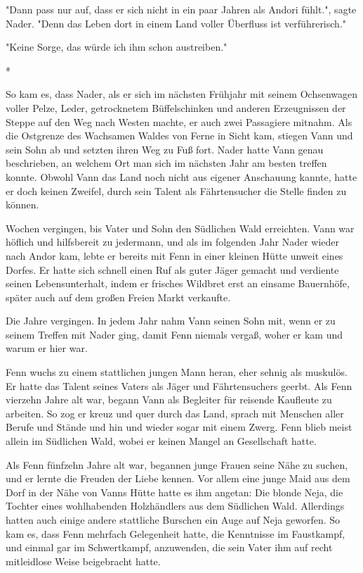 \documentclass[10pt, a4paper, oneside]{book}
\begin{document}
\begin{multicols}{2}
"Dann pass nur auf, dass er sich nicht in ein paar Jahren als Andori fühlt.", sagte Nader. "Denn das Leben dort in einem Land voller Überfluss ist verführerisch."

"Keine Sorge, das würde ich ihm schon austreiben."

\begin{center}
    *
\end{center}

So kam es, dass Nader, als er sich im nächsten Frühjahr mit seinem Ochsenwagen voller Pelze, Leder, getrocknetem Büffelschinken und anderen Erzeugnissen der Steppe auf den Weg nach Westen machte, er auch zwei Passagiere mitnahm. Als die Ostgrenze des Wachsamen Waldes von Ferne in Sicht kam, stiegen Vann und sein Sohn ab und setzten ihren Weg zu Fuß fort. Nader hatte Vann genau beschrieben, an welchem Ort man sich im nächsten Jahr am besten treffen konnte. Obwohl Vann das Land noch nicht aus eigener Anschauung kannte, hatte er doch keinen Zweifel, durch sein Talent als Fährtensucher die Stelle finden zu können.

Wochen vergingen, bis Vater und Sohn den Südlichen Wald erreichten. Vann war höflich und hilfsbereit zu jedermann, und als im folgenden Jahr Nader wieder nach Andor kam, lebte er bereits mit Fenn in einer kleinen Hütte unweit eines Dorfes. Er hatte sich schnell einen Ruf als guter Jäger gemacht und verdiente seinen Lebensunterhalt, indem er frisches Wildbret erst an einsame Bauernhöfe, später auch auf dem großen Freien Markt verkaufte.

Die Jahre vergingen. In jedem Jahr nahm Vann seinen Sohn mit, wenn er zu seinem Treffen mit Nader ging, damit Fenn niemals vergaß, woher er kam und warum er hier war.

Fenn wuchs zu einem stattlichen jungen Mann heran, eher sehnig als muskulös. Er hatte das Talent seines Vaters als Jäger und Fährtensuchers geerbt. Als Fenn vierzehn Jahre alt war, begann Vann als Begleiter für reisende Kaufleute zu arbeiten. So zog er kreuz und quer durch das Land, sprach mit Menschen aller Berufe und Stände und hin und wieder sogar mit einem Zwerg. Fenn blieb meist allein im Südlichen Wald, wobei er keinen Mangel an Gesellschaft hatte.

Als Fenn fünfzehn Jahre alt war, begannen junge Frauen seine Nähe zu suchen, und er lernte die Freuden der Liebe kennen. Vor allem eine junge Maid aus dem Dorf in der Nähe von Vanns Hütte hatte es ihm angetan: Die blonde Neja, die Tochter eines wohlhabenden Holzhändlers aus dem Südlichen Wald. Allerdings hatten auch einige andere stattliche Burschen ein Auge auf Neja geworfen. So kam es, dass Fenn mehrfach Gelegenheit hatte, die Kenntnisse im Faustkampf, und einmal gar im Schwertkampf, anzuwenden, die sein Vater ihm auf recht mitleidlose Weise beigebracht hatte.


\end{multicols}
\end{document}
